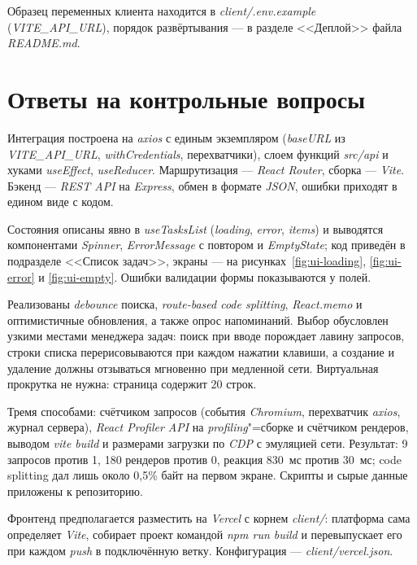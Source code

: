 \documentclass{stp}
\newcommand{\en}[1]{\textit{#1}}
\begin{document}
Образец переменных клиента находится в \en{client/.env.example}
(\en{VITE\_API\_URL}), порядок развёртывания --- в разделе <<Деплой>>
файла \en{README.md}.

\section{Ответы на контрольные вопросы}

\begin{stpnum}
  \item Интеграция построена на \en{axios} с единым экземпляром
    (\en{baseURL} из \en{VITE\_API\_URL}, \en{withCredentials},
    перехватчики), слоем функций \en{src/api} и хуками \en{useEffect},
    \en{useReducer}. Маршрутизация --- \en{React Router}, сборка ---
    \en{Vite}. Бэкенд --- \en{REST API} на \en{Express}, обмен в формате
    \en{JSON}, ошибки приходят в едином виде с кодом.
  \item Состояния описаны явно в \en{useTasksList} (\en{loading},
    \en{error}, \en{items}) и выводятся компонентами \en{Spinner},
    \en{ErrorMessage} с повтором и \en{EmptyState}; код приведён в
    подразделе <<Список задач>>, экраны --- на
    рисунках~\ref{fig:ui-loading}, \ref{fig:ui-error} и \ref{fig:ui-empty}.
    Ошибки валидации формы показываются у полей.
  \item Реализованы \en{debounce} поиска, \en{route-based code splitting},
    \en{React.memo} и оптимистичные обновления, а также опрос
    напоминаний. Выбор обусловлен узкими местами менеджера задач: поиск
    при вводе порождает лавину запросов, строки списка перерисовываются
    при каждом нажатии клавиши, а создание и удаление должны отзываться
    мгновенно при медленной сети. Виртуальная прокрутка не нужна: страница
    содержит 20 строк.
  \item Тремя способами: счётчиком запросов (события \en{Chromium},
    перехватчик \en{axios}, журнал сервера), \en{React Profiler API}
    на \en{profiling}"=сборке и счётчиком рендеров, выводом \en{vite build}
    и размерами загрузки по \en{CDP} с эмуляцией сети. Результат:
    9 запросов против 1, 180 рендеров против 0, реакция 830~мс против
    30~мс; code splitting дал лишь около 0,5\% байт на первом экране.
    Скрипты и сырые данные приложены к репозиторию.
  \item Фронтенд предполагается разместить на \en{Vercel} с корнем
    \en{client/}: платформа сама определяет \en{Vite}, собирает проект
    командой \en{npm run build} и перевыпускает его при каждом \en{push}
    в подключённую ветку. Конфигурация --- \en{client/vercel.json}.

\end{stpnum}
\end{document}
